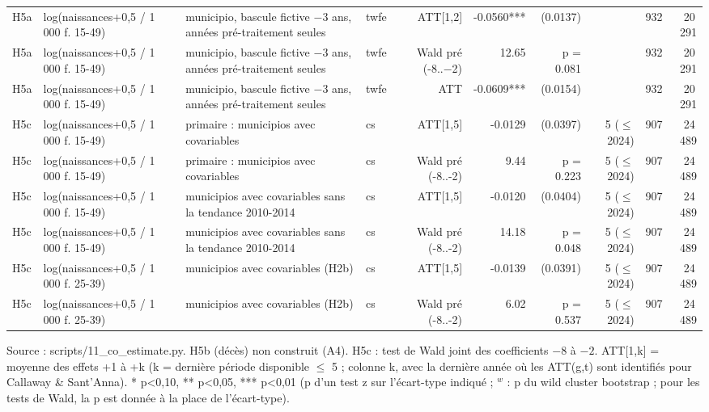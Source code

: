 \begin{table}
\begin{threeparttable}
\begin{tabular}{lp{5.0cm}p{6.4cm}lrrrrrr}
H5a & log(naissances+0,5 / 1 000 f. 15-49) & municipio, bascule fictive $-$3 ans, années pré-traitement seules & twfe & ATT[1,2] & -0.0560*** & (0.0137) &  & 932 & 20\,291 \\
H5a & log(naissances+0,5 / 1 000 f. 15-49) & municipio, bascule fictive $-$3 ans, années pré-traitement seules & twfe & Wald pré (-8..$-$2) & 12.65 & p = 0.081 &  & 932 & 20\,291 \\
H5a & log(naissances+0,5 / 1 000 f. 15-49) & municipio, bascule fictive $-$3 ans, années pré-traitement seules & twfe & ATT & -0.0609*** & (0.0154) &  & 932 & 20\,291 \\
H5c & log(naissances+0,5 / 1 000 f. 15-49) & primaire : municipios avec covariables & cs & ATT[1,5] & -0.0129 & (0.0397) & 5 ($\leq$ 2024) & 907 & 24\,489 \\
H5c & log(naissances+0,5 / 1 000 f. 15-49) & primaire : municipios avec covariables & cs & Wald pré (-8..-2) & 9.44 & p = 0.223 & 5 ($\leq$ 2024) & 907 & 24\,489 \\
H5c & log(naissances+0,5 / 1 000 f. 15-49) & municipios avec covariables sans la tendance 2010-2014 & cs & ATT[1,5] & -0.0120 & (0.0404) & 5 ($\leq$ 2024) & 907 & 24\,489 \\
H5c & log(naissances+0,5 / 1 000 f. 15-49) & municipios avec covariables sans la tendance 2010-2014 & cs & Wald pré (-8..-2) & 14.18 & p = 0.048 & 5 ($\leq$ 2024) & 907 & 24\,489 \\
H5c & log(naissances+0,5 / 1 000 f. 25-39) & municipios avec covariables (H2b) & cs & ATT[1,5] & -0.0139 & (0.0391) & 5 ($\leq$ 2024) & 907 & 24\,489 \\
H5c & log(naissances+0,5 / 1 000 f. 25-39) & municipios avec covariables (H2b) & cs & Wald pré (-8..-2) & 6.02 & p = 0.537 & 5 ($\leq$ 2024) & 907 & 24\,489 \\
\bottomrule
\end{tabular}
\begin{tablenotes}\footnotesize
\item Source : scripts/11\_co\_estimate.py. H5b (décès) non construit (A4). H5c : test de Wald joint des coefficients $-8$ à $-2$. ATT[1,k] = moyenne des effets +1 à +k (k = dernière période disponible $\leq$ 5 ; colonne k, avec la dernière année où les ATT(g,t) sont identifiés pour Callaway \& Sant'Anna). * p<0,10, ** p<0,05, *** p<0,01 (p d'un test z sur l'écart-type indiqué ; $^{w}$ : p du wild cluster bootstrap ; pour les tests de Wald, la p est donnée à la place de l'écart-type).
\end{tablenotes}
\end{threeparttable}
\end{table}
